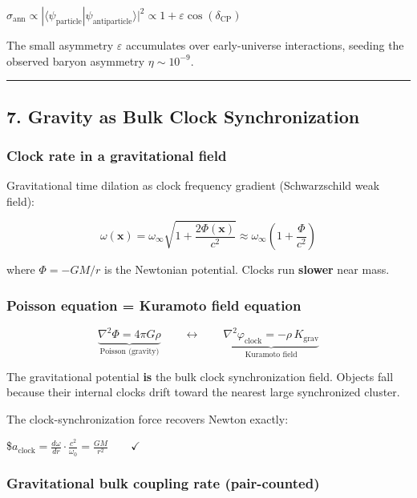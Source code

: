 \documentclass[
]{article}
\begin{document}
\(\sigma_{\text{ann}} \propto |\langle\psi_{\text{particle}}|\psi_{\text{antiparticle}}\rangle|^2 \propto 1 + \varepsilon\cos(\delta_{\text{CP}})\)

The small asymmetry \(\varepsilon\) accumulates over early-universe
interactions, seeding the observed baryon asymmetry
\(\eta \sim 10^{-9}\).

\begin{center}\rule{0.5\linewidth}{0.5pt}\end{center}

\subsection{7. Gravity as Bulk Clock
Synchronization}\label{gravity-as-bulk-clock-synchronization}

\subsubsection{Clock rate in a gravitational
field}\label{clock-rate-in-a-gravitational-field}

Gravitational time dilation as clock frequency gradient (Schwarzschild
weak field):

\[\omega(\mathbf{x}) = \omega_\infty \sqrt{1 + \frac{2\Phi(\mathbf{x})}{c^2}} \approx \omega_\infty\!\left(1 + \frac{\Phi}{c^2}\right)\]

where \(\Phi = -GM/r\) is the Newtonian potential. Clocks run
\textbf{slower} near mass.

\subsubsection{Poisson equation = Kuramoto field
equation}\label{poisson-equation-kuramoto-field-equation}

\[\underbrace{\nabla^2 \Phi = 4\pi G \rho}_{\text{Poisson (gravity)}} \qquad \longleftrightarrow \qquad \underbrace{\nabla^2 \varphi_{\text{clock}} = -\rho\, K_{\text{grav}}}_{\text{Kuramoto field}}\]

The gravitational potential \textbf{is} the bulk clock synchronization
field. Objects fall because their internal clocks drift toward the
nearest large synchronized cluster.

The clock-synchronization force recovers Newton exactly:

\$\(a_{\text{clock}} = \frac{d\omega}{dr} \cdot \frac{c^2}{\omega_0} = \frac{GM}{r^2} \qquad \checkmark\)

\subsubsection{Gravitational bulk coupling rate
(pair-counted)}\label{gravitational-bulk-coupling-rate-pair-counted}
\end{document}
